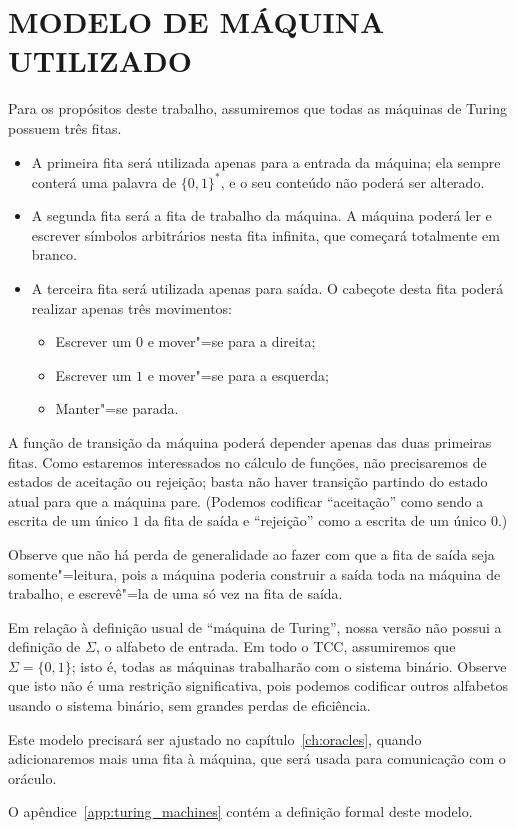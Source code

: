 \section{MODELO DE MÁQUINA UTILIZADO}

Para os propósitos deste trabalho,
assumiremos que todas as máquinas de Turing possuem três fitas.
\begin{itemize}
    \item A primeira fita será utilizada apenas para a entrada da máquina;
        ela sempre conterá uma palavra de $\{0, 1\}^*$,
        e o seu conteúdo não poderá ser alterado.
    \item A segunda fita será a fita de trabalho da máquina.
        A máquina poderá ler e escrever símbolos arbitrários nesta fita infinita,
        que começará totalmente em branco.
    \item A terceira fita será utilizada apenas para saída.
        O cabeçote desta fita poderá realizar apenas três movimentos:
        \begin{itemize}
            \item Escrever um $0$ e mover"=se para a direita;
            \item Escrever um $1$ e mover"=se para a esquerda;
            \item Manter"=se parada.
        \end{itemize}
\end{itemize}

A função de transição da máquina poderá depender apenas das duas primeiras fitas.
Como estaremos interessados no cálculo de funções,
não precisaremos de estados de aceitação ou rejeição;
basta não haver transição partindo do estado atual para que a máquina pare.
(Podemos codificar ``aceitação'' como sendo a escrita de um único $1$ da fita de saída
e ``rejeição'' como a escrita de um único $0$.)

Observe que não há perda de generalidade
ao fazer com que a fita de saída seja somente"=leitura,
pois a máquina poderia construir a saída toda na máquina de trabalho,
e escrevê"=la de uma só vez na fita de saída.

Em relação à definição usual de ``máquina de Turing'',
nossa versão não possui a definição de $\Sigma$,
o alfabeto de entrada.
Em todo o TCC,
assumiremos que $\Sigma = \{0, 1\}$;
isto é, todas as máquinas trabalharão com o sistema binário.
Observe que isto não é uma restrição significativa,
pois podemos codificar outros alfabetos usando o sistema binário,
sem grandes perdas de eficiência.

Este modelo precisará ser ajustado no capítulo~\ref{ch:oracles},
quando adicionaremos mais uma fita à máquina,
que será usada para comunicação com o oráculo.

O apêndice~\ref{app:turing_machines}
contém a definição formal deste modelo.
